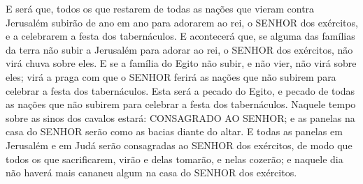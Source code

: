 {E será que, todos os que restarem de todas as nações que vieram contra Jerusalém subirão de ano em ano para adorarem ao rei, o SENHOR dos exércitos, e a celebrarem a festa dos tabernáculos.
E acontecerá que, se alguma das famílias da terra não subir a Jerusalém para adorar ao rei, o SENHOR dos exércitos, não virá chuva sobre eles.
E se a família do Egito não subir, e não vier, não virá
{} sobre eles; virá a praga com que o SENHOR ferirá as nações que não subirem para celebrar a festa dos tabernáculos.
Esta será a
{} pecado do Egito, e
{} pecado de todas as nações que não subirem para celebrar a festa dos tabernáculos.
Naquele tempo sobre as sinos dos cavalos estará: CONSAGRADO AO SENHOR; e as panelas na casa do SENHOR serão como as bacias diante do altar.
E todas as panelas em Jerusalém e em Judá serão consagradas ao SENHOR dos exércitos, de modo que todos os que sacrificarem, virão e delas tomarão, e nelas cozerão; e naquele dia não haverá mais cananeu
 algum na casa do SENHOR dos exércitos.\par }